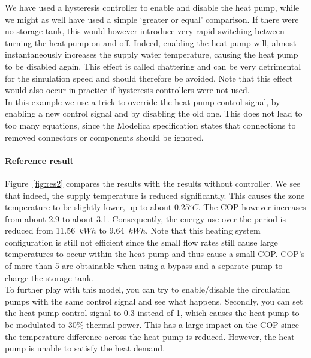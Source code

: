 \documentclass[10pt,a4paper]{article}
\begin{document}
We have used a hysteresis controller to enable and disable the heat pump,
while we might as well have used a simple `greater or equal' comparison.
If there were no storage tank,
this would however introduce very rapid switching between turning the heat pump on
and off. Indeed, enabling the heat pump will, almost instantaneously increases the 
supply water temperature, causing the heat pump to be disabled again.
This effect is called chattering and can be very detrimental for the simulation speed 
and should therefore be avoided.
Note that this effect would also occur in practice if hysteresis controllers were not used.\\

In this example we use a trick to override the heat pump control signal, by enabling a new
control signal and by disabling the old one. This does not lead
to too many equations, since the Modelica specification states that 
connections to removed connectors or components should be ignored.

\newpage

\paragraph{Reference result}
Figure~\ref{fig:res2} compares the results with the results without controller.
We see that indeed, the supply temperature is reduced significantly.
This causes the zone temperature to be slightly lower, up to about 0.25$^{\circ}C$.
The COP however increases from about 2.9 to about 3.1.
Consequently, the energy use over the period is reduced from 11.56~$kWh$
to 9.64~$kWh$. Note that this heating system configuration is still 
not efficient since the small flow rates still cause 
large temperatures to occur within the heat pump
and thus cause a small COP.
COP's of more than 5 are obtainable when using a bypass and a separate
pump to charge the storage tank.\\

To further play with this model, you can try to enable/disable the circulation pumps with the same control
signal and see what happens.
Secondly, you can set the heat pump control signal to 0.3 instead of 1,
which causes the heat pump to be modulated to 30\% thermal power.
This has a large impact on the COP since the temperature difference across the heat 
pump is reduced. 
However, the heat pump is unable to satisfy the heat demand.\\
\end{document}
